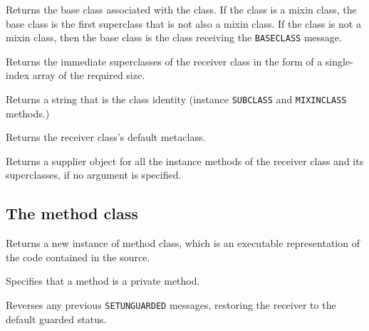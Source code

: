 

Returns the base class associated with the class. If the class is a
mixin class, the base class is the first superclass that is not also a
mixin class. If the class is not a mixin class, then the base class is
the class receiving the \texttt{BASECLASS} message.



Returns the immediate superclasses of the receiver class in the form of
a single-index array of the required size.



Returns a string that is the class identity (instance \texttt{SUBCLASS}
and \texttt{MIXINCLASS} methods.)



Returns the receiver class's default metaclass.



Returns a supplier object for all the instance methods of the receiver
class and its superclasses, if no argument is specified.

\subsection{The method class}\label{the-method-class}



Returns a new instance of method class, which is an executable
representation of the code contained in the source.



Specifies that a method is a private method.



Reverses any previous \texttt{SETUNGUARDED} messages, restoring the
receiver to the default guarded status.

